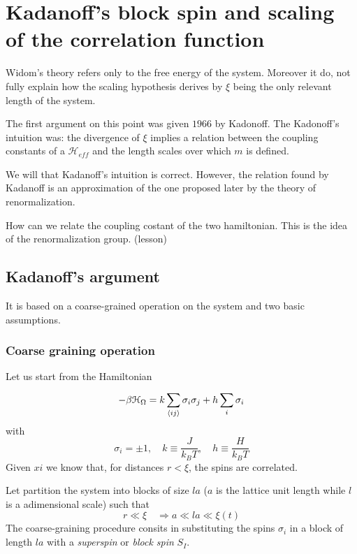 \documentclass[../main/main.tex]{subfiles}
\begin{document}
\section{Kadanoff's block spin and scaling of the correlation function}
Widom's theory refers only to the free energy of the system. Moreover it do, not fully explain how the scaling hypothesis derives by \( \xi  \) being the only relevant length of the system.

The first argument on this point was given \( 1966 \) by Kadonoff.
The Kadonoff's intuition was: the divergence of \( \xi  \) implies a relation between the coupling constants of a \( \mathcal{H}_{eff} \) and the length scales over which \( m \) is defined.

We will that Kadanoff's intuition is correct. However, the relation found by Kadanoff is an approximation of the one proposed later by the theory of renormalization.
\begin{remark}
How can we relate the coupling costant of the two hamiltonian. This is the idea of the renormalization group. (lesson)
\end{remark}
\subsection{Kadanoff's argument}
It is based on a coarse-grained operation on the system and two basic assumptions.
\subsubsection{Coarse graining operation}
Let us start from the Hamiltonian
\begin{equation}
  - \beta \mathcal{H}_{\Omega } = k \sum_{\expval{ij} }^{} \sigma _i \sigma _j + h \sum_{i}^{} \sigma _i
\end{equation}
with
\begin{equation}
  \sigma _i = \pm 1, \quad k \equiv \frac{J}{k_B T}, \quad h \equiv \frac{H}{k_B T}
\end{equation}
Given \( xi \) we know that, for distances \( r < \xi  \), the spins are correlated.

Let partition the system into blocks of size \( la \) (\( a \) is the lattice unit length while \( l \) is a adimensional scale) such that
\begin{equation}
  r \ll \xi  \quad \Rightarrow a \ll l a \ll \xi (t)
\end{equation}
The coarse-graining procedure consits in substituting the spins \( \sigma _i \) in a block of length \( la \) with a \emph{superspin} or \emph{block spin} \( S_I \).
\end{document}
